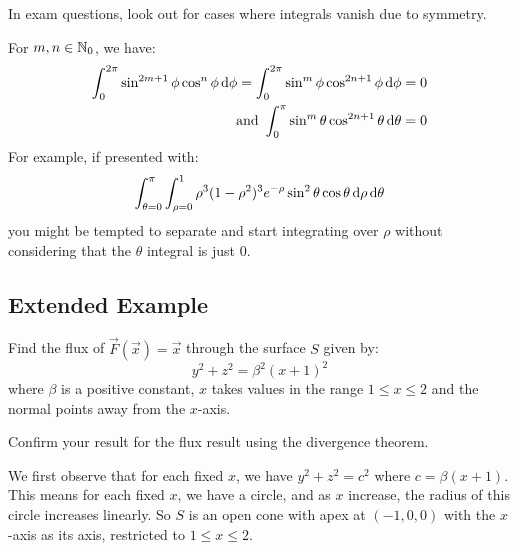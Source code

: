\documentclass[../main.tex]{subfiles}
\begin{document}
\begin{remark}[Advice]
  In exam questions, look out for cases where integrals vanish due to symmetry.

  For $m, n \in \mathbb{N}_0$, we have:
  \begin{align*}
    \int_{0}^{2\pi} \sin^{2m + 1} \phi \cos^n \phi \d{\phi} = \int_{0}^{2\pi} \sin^{m} \phi \cos^{2n + 1} \phi \d{\phi} &= 0 \\
    \text{ and } \int_{0}^{\pi} \sin^{m} \theta \cos^{2n + 1}\theta \d{\theta} &= 0
  \end{align*}
  For example, if presented with:
  \[
    \int_{\theta = 0}^{\pi} \int_{\rho = 0}^{1} \rho^3(1 - \rho^2)^3 e^{-\rho} \sin^2 \theta \cos \theta \d{\rho} \d{\theta}
  \]
  you might be tempted to separate and start integrating over $\rho$ without considering that the $\theta$ integral is just $0$.
\end{remark}
\subsection{Extended Example}
\begin{remark}[Question]
  Find the flux of $\vec{F}(\vec{x}) = \vec{x}$ through the surface $S$ given by:
  \[
    y^2 + z^2 = \beta^2 (x + 1)^2
  \]
  where $\beta$ is a positive constant, $x$ takes values in the range $1 \leq x \leq 2$ and the normal points away from the $x$-axis.

  Confirm your result for the flux result using the divergence theorem.
\end{remark}
We first observe that for each fixed $x$, we have $y^2 + z^2 = c^2$ where $c = \beta(x + 1)$.
This means for each fixed $x$, we have a circle, and as $x$ increase, the radius of this circle increases linearly.
So $S$ is an open cone with apex at $(-1, 0, 0)$ with the $x$-axis as its axis, restricted to $1 \leq x \leq 2$.
\begin{center}
\end{center}
\end{document}
